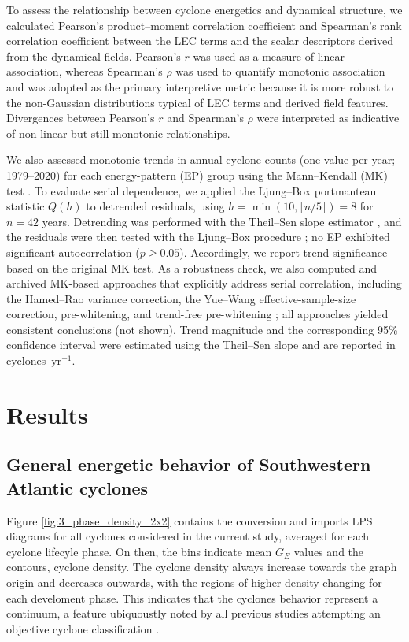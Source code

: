 \documentclass[pdflatex,sn-chicago]{sn-jnl}%
\theoremstyle{plain}
\theoremstyle{definition}
\theoremstyle{remark}
\theoremstyle{definition}
\begin{document}
To assess the relationship between cyclone energetics and dynamical structure, we calculated Pearson's product--moment correlation coefficient \citep{pearson1920notes} and Spearman's rank correlation coefficient \citep{spearman1987proof} between the LEC terms and the scalar descriptors derived from the dynamical fields. Pearson's \(r\) was used as a measure of linear association, whereas Spearman's \(\rho\) was used to quantify monotonic association and was adopted as the primary interpretive metric because it is more robust to the non-Gaussian distributions typical of LEC terms and derived field features. Divergences between Pearson's \(r\) and Spearman's \(\rho\) were interpreted as indicative of non-linear but still monotonic relationships. 

We also assessed monotonic trends in annual cyclone counts (one value per year; 1979--2020) for each energy-pattern (EP) group using the Mann--Kendall (MK) test \citep{mann1945nonparametric,kendall1948rank}. To evaluate serial dependence, we applied the Ljung--Box portmanteau statistic $Q(h)$ to detrended residuals, using $h=\min(10,\lfloor n/5\rfloor)=8$ for $n=42$ years. Detrending was performed with the Theil--Sen slope estimator \citep{sen1968estimates}, and the residuals were then tested with the Ljung--Box procedure \citep{ljung1978measure}; no EP exhibited significant autocorrelation ($p\ge 0.05$). Accordingly, we report trend significance based on the original MK test. As a robustness check, we also computed and archived MK-based approaches that explicitly address serial correlation, including the Hamed--Rao variance correction, the Yue--Wang effective-sample-size correction, pre-whitening, and trend-free pre-whitening \citep{KulkarniVonStorch1995,hamed1998modified,YueEtAl2002_TFPW,YueWang2004}; all approaches yielded consistent conclusions (not shown). Trend magnitude and the corresponding 95\% confidence interval were estimated using the Theil--Sen slope and are reported in cyclones~yr$^{-1}$.


\section{Results}\label{sec:results}

\subsection{General energetic behavior of Southwestern Atlantic cyclones}

Figure \ref{fig:3_phase_density_2x2} contains the conversion and imports LPS diagrams for all cyclones considered in the current study, averaged for each cyclone lifecyle phase. On then, the bins indicate mean $G_E$ values and the contours, cyclone density. The cyclone density always increase towards the graph origin and decreases outwards, with the regions of higher density changing for each develoment phase. This indicates that the cyclones behavior represent a continuum, a feature ubiquoustly noted by all previous studies attempting an objective cyclone classification \citet[e.g.][]{hart2003cyclone,yanase2014parameter,graf2017objective,dekker2018characteristics,corner2025classification}.
\end{document}
